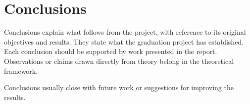 \chapter{Conclusions}
\label{ch:conclusions}

Conclusions explain what follows from the project, with reference to its
original objectives and results. They state what the graduation project has
established. Each conclusion should be supported by work presented in the
report. Observations or claims drawn directly from theory belong in the
theoretical framework.

Conclusions usually close with future work or suggestions for improving the
results.

